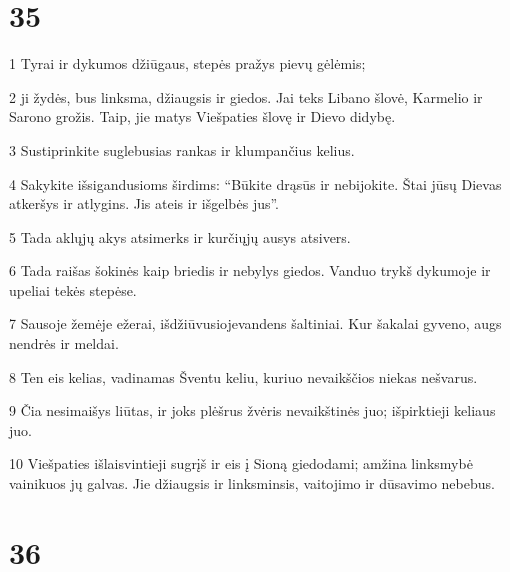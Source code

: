 \chapter{35}


\par 1 Tyrai ir dykumos džiūgaus, stepės pražys pievų gėlėmis; 
\par 2 ji žydės, bus linksma, džiaugsis ir giedos. Jai teks Libano šlovė, Karmelio ir Sarono grožis. Taip, jie matys Viešpaties šlovę ir Dievo didybę. 
\par 3 Sustiprinkite suglebusias rankas ir klumpančius kelius. 
\par 4 Sakykite išsigandusioms širdims: “Būkite drąsūs ir nebijokite. Štai jūsų Dievas atkeršys ir atlygins. Jis ateis ir išgelbės jus”. 
\par 5 Tada aklųjų akys atsimerks ir kurčiųjų ausys atsivers. 
\par 6 Tada raišas šokinės kaip briedis ir nebylys giedos. Vanduo trykš dykumoje ir upeliai tekės stepėse. 
\par 7 Sausoje žemėje ežerai, išdžiūvusioje­vandens šaltiniai. Kur šakalai gyveno, augs nendrės ir meldai. 
\par 8 Ten eis kelias, vadinamas Šventu keliu, kuriuo nevaikščios niekas nešvarus. 
\par 9 Čia nesimaišys liūtas, ir joks plėšrus žvėris nevaikštinės juo; išpirktieji keliaus juo. 
\par 10 Viešpaties išlaisvintieji sugrįš ir eis į Sioną giedodami; amžina linksmybė vainikuos jų galvas. Jie džiaugsis ir linksminsis, vaitojimo ir dūsavimo nebebus.



\chapter{36}



